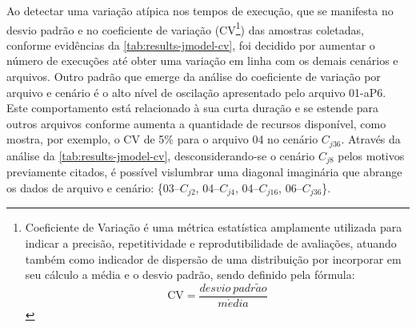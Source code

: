 \documentclass[english,brazilian]{UNISINOSmonografia} %
\begin{document}
Ao detectar uma variação atípica nos tempos de execução, que se manifesta no desvio padrão e no coeficiente de variação (CV\footnote{
	Coeficiente de Variação é uma métrica estatística amplamente utilizada para indicar a precisão, repetitividade e reprodutibilidade de avaliações, atuando também como indicador de dispersão de uma distribuição por incorporar em seu cálculo a média e o desvio padrão, sendo definido pela fórmula:
	\[ \text{CV} = \dfrac{desvio~padr\tilde{a}o}{m\acute{e}dia} \]
}) das amostras coletadas, conforme evidências da \autoref{tab:results-jmodel-cv}, 
foi decidido por aumentar o número de execuções até obter uma variação em linha com os demais cenários e arquivos.
%
Outro padrão que emerge da análise do coeficiente de variação por arquivo e cenário é o alto nível de oscilação apresentado pelo arquivo 01-aP6.
%
Este comportamento está relacionado à sua curta duração e se estende para outros arquivos conforme aumenta a quantidade de recursos disponível, como mostra, por exemplo, o CV de 5\% para o arquivo 04 no cenário $C_{j36}$.
%
Através da análise da \autoref{tab:results-jmodel-cv}, desconsiderando-se o cenário $C_{j8}$ pelos motivos previamente citados, é possível vislumbrar uma 
diagonal imaginária que abrange os dados de arquivo e cenário: \{03--$C_{j2}$, 04--$C_{j4}$, 04--$C_{j16}$, 06--$C_{j36}$\}.
\end{document}
